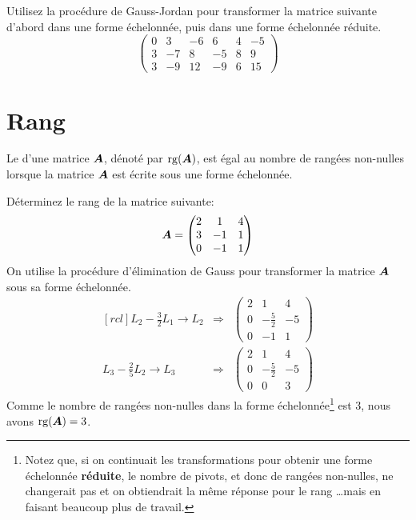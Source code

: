 \begin{exerciceB}
	Utilisez la procédure de Gauss-Jordan pour transformer la matrice suivante d'abord dans une forme échelonnée, puis dans une forme échelonnée réduite.
	\[
	\begin{pmatrix}
	0 & 3 & -6 & 6 & 4 & -5 \\
	3 & -7 & 8 & -5 & 8 & 9\\
	3 & -9 & 12 & -9 & 6 & 15
	\end{pmatrix}
	\]
\end{exerciceB}


\section{Rang}
\begin{defini}
Le  d'une matrice $\boldsymbol{A}$, dénoté par $\operatorname{rg}(\boldsymbol{A})$, est égal au nombre de rangées non-nulles lorsque la matrice $\boldsymbol{A}$ est écrite sous une forme échelonnée.
\end{defini}
\begin{exemple}
	Déterminez le rang de la matrice suivante:
	\[
	\boldsymbol{A} = \begin{pmatrix}
	2 & 1 & 4 \\
	3 & -1 & 1\\
	0 & -1 & 1
	\end{pmatrix}
	\]
	\solution
	On utilise la procédure d'élimination de Gauss pour transformer la matrice $\boldsymbol{A}$ sous sa forme échelonnée.
	\[
	\begin{matrix}[rcl]
		L_2 - \frac{3}{2} L_1 \rightarrow L_2
		&\Longrightarrow&
		 \begin{pmatrix}
		2 & 1 & 4 \\[5pt]
		0 & -\frac{5}{2} & -5\\[5pt]
		0 & -1 & 1
		\end{pmatrix}
        \\[20pt]
		L_3 - \frac{2}{5} L_2 \rightarrow L_3
		&\Longrightarrow&
		 \begin{pmatrix}
		2 & 1 & 4 \\[5pt]
		0 & -\frac{5}{2} & -5\\[5pt]
		0 & 0 & 3
		\end{pmatrix}
	\end{matrix}
	\]
	Comme le nombre de rangées non-nulles dans la forme échelonnée\footnote{Notez que,
	si on continuait les transformations pour obtenir une forme échelonnée \textbf{réduite}, 
	le nombre de pivots, et donc de rangées non-nulles, ne changerait pas et on obtiendrait
	la même réponse pour le rang \ldots mais en faisant beaucoup plus de travail.}
	 est 3, nous avons $\operatorname{rg}(\boldsymbol{A})=3$.
\end{exemple}

